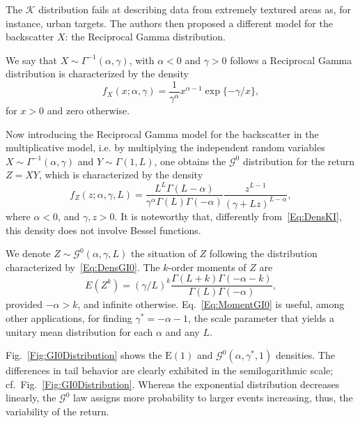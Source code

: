 \documentclass{beamer}
\begin{document}
\begin{frame}[allowframebreaks]
The $\mathcal{K}$ distribution fails at describing data from extremely textured areas as, for instance, urban targets.
The authors then proposed a different model for the backscatter $X$: the Reciprocal Gamma distribution.

We say that $X\sim{\Gamma^{-1}}(\alpha,\gamma)$, with $\alpha<0$ and $\gamma>0$ follows a 
Reciprocal Gamma distribution is characterized by the density
\begin{equation}
f_X(x;\alpha,\gamma) = \frac{1}{\gamma^\alpha} x^{\alpha-1} \exp\{-\gamma/x\},
\label{Eq:IGdensity}
\end{equation}
for $x>0$ and zero otherwise.

Now introducing the Reciprocal Gamma model for the backscatter in the multiplicative model, i.e. by multiplying the independent random variables $X\sim{\Gamma^{-1}}(\alpha,\gamma)$ and $Y\sim\Gamma(1,L)$, one obtains the $\mathcal{G}^0$ distribution for the return $Z=XY$, which is characterized by the density
\begin{equation}
f_Z(z; \alpha,\gamma,L) = \frac{L^L \Gamma(L-\alpha)}{\gamma^\alpha \Gamma(L)\Gamma(-\alpha)} \frac{z^{L-1}}{(\gamma+L z)^{L-\alpha}},
\label{Eq:DensGI0}
\end{equation}
where $\alpha<0$, and $\gamma,z>0$.
It is noteworthy that, differently from~\eqref{Eq:DensKI}, this density does not involve Bessel functions.

We denote $Z\sim \mathcal G^0(\alpha,\gamma,L)$ the situation of $Z$ following the distribution characterized by~\eqref{Eq:DensGI0}.
The $k$-order moments of $Z$ are
\begin{equation}
E(Z^k) = (\gamma / L)^{k} \frac{\Gamma(L+k)\Gamma(-\alpha-k)}{\Gamma(L)\Gamma(-\alpha)},
\label{Eq:MomentGI0}
\end{equation}
provided $-\alpha>k$, and infinite otherwise.
Eq.~\eqref{Eq:MomentGI0} is useful, among other applications, for finding $\gamma^*=-\alpha-1$, the scale parameter that yields a unitary mean distribution for each $\alpha$ and any $L$.

Fig.~\ref{Fig:GI0Distribution} shows the $\text{E}(1)$ and $\mathcal G^0(\alpha,\gamma^*, 1)$ densities.
The differences in tail behavior are clearly exhibited in the semilogarithmic scale; cf.\ Fig.~\ref{Fig:GI0Distribution}.
Whereas the exponential distribution decreases linearly, the $\mathcal G^0$ law assigns more probability to larger events increasing, thus, the variability of the return.


\end{frame}
\end{document}
